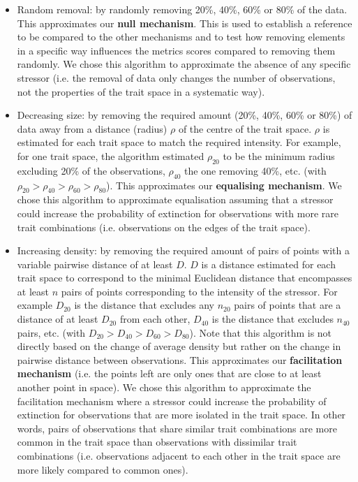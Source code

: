 \documentclass[12pt,letterpaper]{article}
\begin{document}
\begin{itemize}
\item Random removal: by randomly removing 20\%, 40\%, 60\% or 80\% of the data.
This approximates our \textbf{null mechanism}. This is used to establish a reference to be compared to the other mechanisms and to test how removing elements in a specific way influences the metrics scores compared to removing them randomly. We chose this algorithm to approximate the absence of any specific stressor (i.e. the removal of data only changes the number of observations, not the properties of the trait space in a systematic way).

\item Decreasing size: by removing the required amount (20\%, 40\%, 60\% or 80\%) of data away from a distance (radius) $\rho$ of the centre of the trait space.
$\rho$ is estimated for each trait space to match the required intensity. For example, for one trait space, the algorithm estimated $\rho_{20}$ to be the minimum radius excluding 20\% of the observations, $\rho_{40}$ the one removing 40\%, etc. (with $\rho_{20} > \rho_{40} > \rho_{60} > \rho_{80}$).
This approximates our \textbf{equalising mechanism}. 
We chose this algorithm to approximate equalisation assuming that a stressor could increase the probability of extinction for observations with more rare trait combinations (i.e. observations on the edges of the trait space).

\item Increasing density: by removing the required amount of pairs of points with a variable pairwise distance of at least $D$.
$D$ is a distance estimated for each trait space to correspond to the minimal Euclidean distance that encompasses at least $n$ pairs of points corresponding to the intensity of the stressor.
For example $D_{20}$ is the distance that excludes any $n_{20}$ pairs of points that are a distance of at least $D_{20}$ from each other, $D_{40}$ is the distance that excludes $n_{40}$ pairs, etc. (with $D_{20} > D_{40} > D_{60} > D_{80}$).
Note that this algorithm is not directly based on the change of average density but rather on the change in pairwise distance between observations.
This approximates our \textbf{facilitation mechanism} (i.e. the points left are only ones that are close to at least another point in space).
We chose this algorithm to approximate the facilitation mechanism where a stressor could increase the probability of extinction for observations that are more isolated in the trait space.
In other words, pairs of observations that share similar trait combinations are more common in the trait space than observations with dissimilar trait combinations (i.e. observations adjacent to each other in the trait space are more likely compared to common ones).


\end{itemize}
\end{document}
